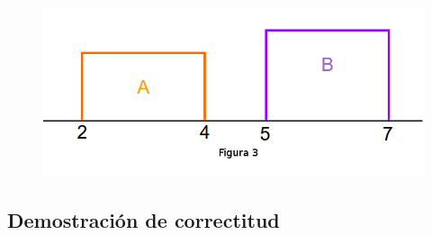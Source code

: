 \begin{figure}[H]
\centering
\includegraphics[scale=0.36]{./Imagenes/Ej2/ab4.png} 
\end{figure}

\subsection{Demostraci\'on de correctitud} 

